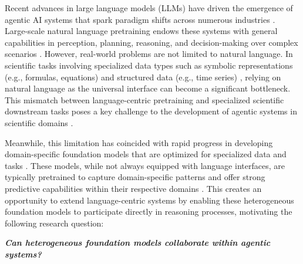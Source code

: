 \documentclass{llmxive}
\begin{document}
{Recent advances in large language models (LLMs) have driven the emergence of agentic AI systems that spark paradigm shifts across numerous industries \cite{DBLP:journals/corr/abs-2303-08774, DBLP:journals/corr/abs-2503-19786, DBLP:journals/corr/abs-2407-21783, DBLP:journals/corr/abs-2601-12538, DBLP:journals/corr/abs-2512-16301, DBLP:journals/corr/abs-2511-20639}. 
Large-scale natural language pretraining endows these systems with general capabilities in perception, planning, reasoning, and decision-making over complex scenarios \cite{DBLP:journals/corr/abs-2307-03109, DBLP:journals/tmlr/FengJLZTCLY24, DBLP:journals/corr/abs-2211-09110}.
However, real-world problems are not limited to natural language. 
In scientific tasks involving specialized data types such as symbolic representations (e.g., formulas, equations) and structured data (e.g., time series) \cite{DBLP:journals/corr/abs-2508-21148, DBLP:journals/jcisd/Weininger88, hersbach2020era5, DBLP:conf/icml/ShojaeeNMFDR25, DBLP:journals/nar/Consortium23}, relying on natural language as the universal interface can become a significant bottleneck. This mismatch between language-centric pretraining and specialized scientific downstream tasks poses a key challenge to the development of agentic systems in scientific domains \cite{DBLP:journals/corr/abs-2508-21148, DBLP:journals/corr/abs-2508-14111, DBLP:journals/corr/abs-2505-19897, rios2026ai}. 

Meanwhile, this limitation has coincided with rapid progress in developing domain-specific foundation models that are optimized for specialized data and tasks \cite{DBLP:journals/nn/MenonMBPJKJ26, DBLP:journals/corr/abs-2312-03014, DBLP:journals/corr/abs-2307-13721, DBLP:journals/corr/abs-2504-04011, DBLP:journals/corr/abs-2108-07258, huang2024foundation}. These models, while not always equipped with language interfaces, are typically pretrained to capture domain-specific patterns and offer strong predictive capabilities within their respective domains \cite{DBLP:journals/corr/abs-2212-12794, DBLP:journals/corr/abs-2405-04285, hamann2024foundation, herzog2025olmoearth}. This creates an opportunity to extend language-centric systems by enabling these heterogeneous foundation models to participate directly in reasoning processes, motivating the following research question:

\vspace{-3mm}
\begin{center}{
\centering\textit{\textbf{
Can heterogeneous foundation models collaborate within agentic systems?
}}
}


\end{center}}
\end{document}
